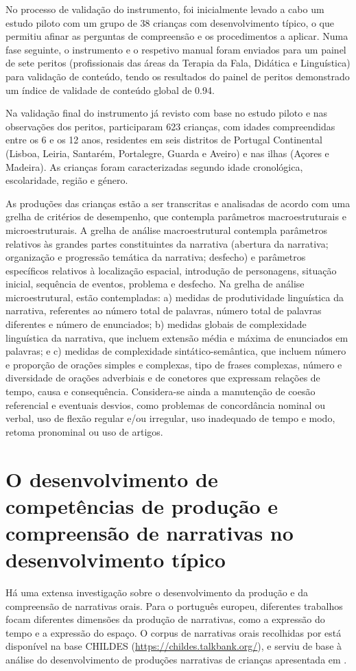 \documentclass[output=paper,colorlinks,citecolor=brown,booklanguage=portuguese]{langscibook}
\begin{document}
No processo de validação do instrumento, foi inicialmente levado a cabo um estudo piloto com um grupo de 38 crianças com desenvolvimento típico, o que permitiu afinar as perguntas de compreensão e os procedimentos a aplicar. Numa fase seguinte, o instrumento e o respetivo manual foram enviados para um painel de sete peritos (profissionais das áreas da Terapia da Fala, Didática e Linguística) para validação de conteúdo, tendo os resultados do painel de peritos demonstrado um índice de validade de conteúdo global de 0.94.

Na validação final do instrumento já revisto com base no estudo piloto e nas observações dos peritos, participaram 623 crianças, com idades compreendidas entre os 6 e os 12 anos, residentes em seis distritos de Portugal Continental (Lisboa, Leiria, Santarém, Portalegre, Guarda e Aveiro) e nas ilhas (Açores e Madeira). As crianças foram caracterizadas segundo idade cronológica, escolaridade, região e género.

As produções das crianças estão a ser transcritas e analisadas de acordo com uma grelha de critérios de desempenho, que contempla parâmetros macroestruturais e microestruturais. A grelha de análise macroestrutural contempla parâmetros relativos às grandes partes constituintes da narrativa (abertura da narrativa; organização e progressão temática da narrativa; desfecho) e parâmetros específicos relativos à localização espacial, introdução de personagens, situação inicial, sequência de eventos, problema e desfecho. Na grelha de análise microestrutural, estão contempladas: a) medidas de produtividade linguística da narrativa, referentes ao número total de palavras, número total de palavras diferentes e número de enunciados; b) medidas globais de complexidade linguística da narrativa, que incluem extensão média e máxima de enunciados em palavras; e c) medidas de complexidade sintático-semântica, que incluem número e proporção de orações simples e complexas, tipo de frases complexas, número e diversidade de orações adverbiais e de conetores que expressam relações de tempo, causa e consequência. Considera-se ainda a manutenção de coesão referencial e eventuais desvios, como problemas de concordância nominal ou verbal, uso de flexão regular e/ou irregular, uso inadequado de tempo e modo, retoma pronominal ou uso de artigos.

\section{O desenvolvimento de competências de produção e compreensão de narrativas no desenvolvimento típico}\label{sec:cincocap16} Há uma extensa investigação sobre o desenvolvimento da produção e da compreensão de narrativas orais. Para o português europeu, diferentes trabalhos \citep{Batoreo1997, EncarnacaoSilva2001, Sousa2007, Sousa2010} focam diferentes dimensões da produção de narrativas, como a expressão do tempo e a expressão do espaço. O corpus de narrativas orais recolhidas por \citet{Batoreo1997} está disponível na base CHILDES (\url{https://childes.talkbank.org/}), e serviu de base à análise do desenvolvimento de produções narrativas de crianças apresentada em \citet{Goncalves2011a}.
\end{document}
